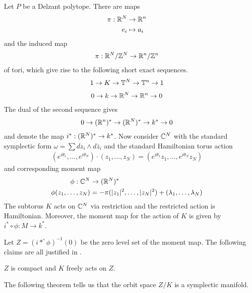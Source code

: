 Let $P$ be a Delzant polytope.
There are maps \begin{align*}
    \pi:\mathbb{R}^N&\to\mathbb{R}^n\\
    e_i &\mapsto a_i
\end{align*} and the induced map \begin{align*}
    \pi: \mathbb{R}^N/\mathbb{Z}^N\to\mathbb{R}^n/\mathbb{Z}^n 
\end{align*} of tori, which give rise to the following short exact sequences. \begin{align}\label{eq:ses1}
    1\to K \to \mathbb{T}^N \to \mathbb{T}^n \to 1
\end{align} \begin{align*}
    0\to k \to \mathbb{R}^N\to \mathbb{R}^n\to 0
\end{align*} The dual of the second sequence gives \begin{align*}
    0 \to (\mathbb{R}^n)^* \to (\mathbb{R}^N)^* \to k^* \to 0
\end{align*} and denote the map $i^* : (\mathbb{R}^N)^*\to k^*$. Now consider $\mathbb{C}^N$
with the standard symplectic form $\omega = \sum dz_i\wedge d\bar z_i$ and the 
standard Hamiltonian torus action \begin{align*}
    (e^{i\theta_1},\dots,e^{i\theta_N})\cdot(z_1,\dots,z_N) = (e^{i\theta_1}z_1,\dots,e^{i\theta_N}z_N)
\end{align*} and corresponding moment map \begin{align*}
    \phi:\mathbb{C}^N&\to(\mathbb{R}^N)^* \\
    \phi(z_1,\dots,z_N) &= -\pi(|z_1|^2,\dots,|z_N|^2) + (\lambda_1,\dots,\lambda_N)
\end{align*}
The subtorus $K$ acts on $\mathbb{C}^N$ via restriction and the restricted action is 
Hamiltonian. Moreover, the moment map for the action of $K$ is given by $i^*\circ\phi:M\to k^*$.

Let $Z = (i*^\circ \phi)^{-1}(0)$ be the zero level set of the moment map. The following 
claims are all justified in \cite{lsg}.

\begin{lemma}
    $Z$ is compact and $K$ freely acts on $Z$. 
\end{lemma}

The following theorem tells us that the orbit space $Z/K$ is a symplectic manifold.


